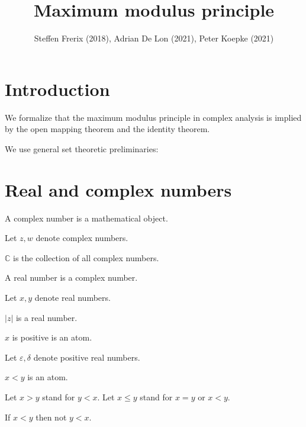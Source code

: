 \documentclass{article}
\title{Maximum modulus principle}
\author{Steffen Frerix (2018), Adrian De Lon (2021), Peter Koepke (2021)}
\date{}
\begin{document}

  \maketitle


  \section{Introduction}

We formalize that the maximum modulus principle in complex analysis is
implied by the open mapping theorem and the identity theorem.

We use general set theoretic preliminaries:

\begin{forthel}
\end{forthel}

\section{Real and complex numbers}

\begin{forthel}
\begin{signature}
      A complex number is a mathematical object.
\end{signature}

Let $z, w$ denote complex numbers.

\begin{definition}
$\mathbb{C}$ is the collection of all complex numbers.
\end{definition}

\begin{signature}
      A real number is a complex number.
\end{signature}

Let $x,y$ denote real numbers.

\begin{signature}
      $|z|$ is a real number.
\end{signature}

\begin{signature}
      $x$ is positive is an atom.
\end{signature}

Let $\varepsilon, \delta$ denote positive real numbers.

    \begin{signature}
      $x < y$ is an atom.
    \end{signature}
    Let $x > y$ stand for $y < x$.
    Let $x \leq y$ stand for $x = y$ or $x < y$.

    \begin{axiom}
      If $x < y$ then not $y < x$.
    \end{axiom}
  \end{forthel}
\end{document}
